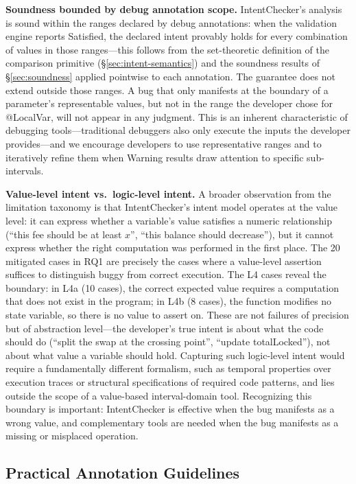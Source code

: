 \documentclass[pdflatex,sn-basic]{sn-jnl}%
\theoremstyle{thmstyleone}%
\theoremstyle{thmstyletwo}%
\theoremstyle{thmstylethree}%
\begin{document}
\smallskip
\noindent\textbf{Soundness bounded by debug annotation scope.}
IntentChecker's analysis is sound within the ranges declared by debug annotations: when the validation engine reports Satisfied, the declared intent provably holds for every combination of values in those ranges---this follows from the set-theoretic definition of the comparison primitive (§\ref{sec:intent-semantics}) and the soundness results of §\ref{sec:soundness} applied pointwise to each annotation.
The guarantee does not extend outside those ranges.
A bug that only manifests at the boundary of a parameter's representable values, but not in the range the developer chose for @LocalVar, will not appear in any judgment.
This is an inherent characteristic of debugging tools---traditional debuggers also only execute the inputs the developer provides---and we encourage developers to use representative ranges and to iteratively refine them when Warning results draw attention to specific sub-intervals.

\smallskip
\noindent\textbf{Value-level intent vs.\ logic-level intent.}
A broader observation from the limitation taxonomy is that IntentChecker's intent model operates at the value level: it can express whether a variable's value satisfies a numeric relationship (``this fee should be at least $x$'', ``this balance should decrease''), but it cannot express whether the right computation was performed in the first place.
The 20 mitigated cases in RQ1 are precisely the cases where a value-level assertion suffices to distinguish buggy from correct execution.
The L4 cases reveal the boundary: in L4a (10 cases), the correct expected value requires a computation that does not exist in the program; in L4b (8 cases), the function modifies no state variable, so there is no value to assert on.
These are not failures of precision but of abstraction level---the developer's true intent is about what the code should do (``split the swap at the crossing point'', ``update totalLocked''), not about what value a variable should hold.
Capturing such logic-level intent would require a fundamentally different formalism, such as temporal properties over execution traces or structural specifications of required code patterns, and lies outside the scope of a value-based interval-domain tool.
Recognizing this boundary is important: IntentChecker is effective when the bug manifests as a wrong value, and complementary tools are needed when the bug manifests as a missing or misplaced operation.

\subsection{Practical Annotation Guidelines}\label{sec:disc:guidelines}
\end{document}
